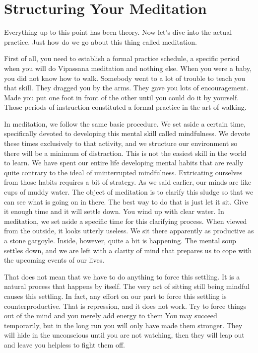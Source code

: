 
\chapter{Structuring Your Meditation} Everything up to this point has been
theory. Now let's dive into the actual practice. Just how do we go about this
thing called meditation.

First of all, you need to establish a formal practice schedule, a specific
period when you will do Vipassana meditation and nothing else. When you were a
baby, you did not know how to walk. Somebody went to a lot of trouble to teach
you that skill. They dragged you by the arms. They gave you lots of
encouragement. Made you put one foot in front of the other until you could do it
by yourself. Those periods of instruction constituted a formal practice in the
art of walking.

In meditation, we follow the same basic procedure. We set aside a certain time,
specifically devoted to developing this mental skill called mindfulness. We
devote these times exclusively to that activity, and we structure our
environment so there will be a minimum of distraction. This is not the easiest
skill in the world to learn. We have spent our entire life developing mental
habits that are really quite contrary to the ideal of uninterrupted mindfulness.
Extricating ourselves from those habits requires a bit of strategy. As we said
earlier, our minds are like cups of muddy water. The object of meditation is to
clarify this sludge so that we can see what is going on in there. The best way
to do that is just let it sit. Give it enough time and it will settle down. You
wind up with clear water. In meditation, we set aside a specific time for this
clarifying process. When viewed from the outside, it looks utterly useless. We
sit there apparently as productive as a stone gargoyle. Inside, however, quite a
bit is happening. The mental soup settles down, and we are left with a clarity
of mind that prepares us to cope with the upcoming events of our lives.

That does not mean that we have to do anything to force this settling. It is a
natural process that happens by itself. The very act of sitting still being
mindful causes this settling. In fact, any effort on our part to force this
settling is counterproductive. That is repression, and it does not work. Try to
force things out of the mind and you merely add energy to them You may succeed
temporarily, but in the long run you will only have made them stronger. They
will hide in the unconscious until you are not watching, then they will leap out
and leave you helpless to fight them off.

